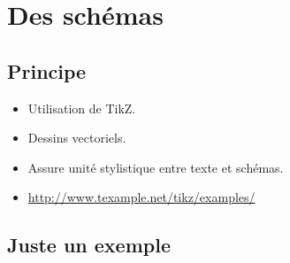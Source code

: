\section{Des schémas}

\subsection{Principe}

\begin{slide}
  \begin{itemize}
    \item Utilisation de TikZ.
    \item Dessins vectoriels.
    \item Assure unité stylistique entre texte et schémas.
    \item \url{http://www.texample.net/tikz/examples/}

  \end{itemize}
\end{slide}

\subsection{Juste un exemple}
\begin{slide}
  \tiny
  \inputminted{latex}{examples/stemma.tex}
\end{slide}

\begin{slide}
  
\end{slide}

\begin{slide}
  \tiny
  \inputminted{latex}{examples/stemma2.tex}
\end{slide}

\begin{slide}
  
\end{slide}


